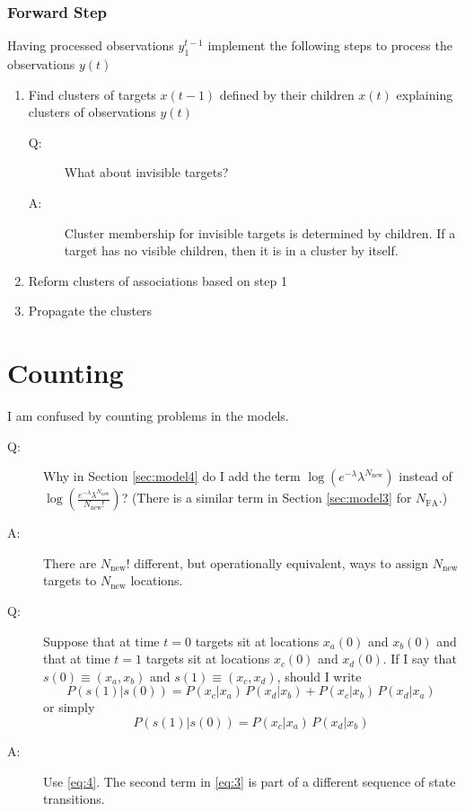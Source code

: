 \documentclass[11pt]{article}
\newcommand{\ti}[2]{{#1}{(#2)}}                         %
\newcommand{\ts}[4]{{#1}_{#3}^{#4}} %
\begin{document}
\subsubsection{Forward Step}
\label{sec:forward_b_m}

Having processed observations $\ts{y}{\tau}{1}{t-1}$ implement the
following steps to process the observations $\ti{y}{t}$
\begin{enumerate}
\item Find clusters of targets $\ti{x}{t-1}$ defined by their children
  $\ti{x}{t}$ explaining clusters of observations $\ti{y}{t}$
  \begin{description}
  \item[Q:] What about invisible targets?
  \item[A:] Cluster membership for invisible targets is determined by
    children.  If a target has no visible children, then it is in a
    cluster by itself.
  \end{description}
\item Reform clusters of associations based on step 1
\item Propagate the clusters
\end{enumerate}

\appendix
\section{Counting}
\label{sec:counting}

I am confused by counting problems in the models.
\begin{description}
\item[Q:] Why in Section \ref{sec:model4} do I add the term $\log
  \left( e^{-\lambda} \lambda^{N_{\text{new}}} \right)$ instead of
  $\log \left(
    \frac{e^{-\lambda}\lambda^{N_{\text{new}}}}{N_{\text{new}}!}\right)$?
  (There is a similar term in Section \ref{sec:model3} for
  $N_{\text{FA}}$.)
\item[A:] There are $N_{\text{new}}!$ different, but operationally
  equivalent, ways to assign $N_{\text{new}}$ targets to
  $N_{\text{new}}$ locations.
\item[Q:] Suppose that at time $t=0$ targets sit at locations
  $\ti{x_a}{0}$ and $\ti{x_b}{0}$ and that at time $t=1$ targets sit
  at locations $\ti{x_c}{0}$ and $\ti{x_d}{0}$.  If I say that
  $\ti{s}{0}\equiv \left(x_a,x_b \right)$ and $\ti{s}{1}\equiv
  \left(x_c,x_d \right)$, should I write
  \begin{equation}
    \label{eq:3}
    P(\ti{s}{1}|\ti{s}{0}) =  P(x_c|x_a) \,  P(x_d|x_b) +  P(x_c|x_b)
    \,  P(x_d|x_a)
  \end{equation}
  or simply
  \begin{equation}
    \label{eq:4}
    P(\ti{s}{1}|\ti{s}{0}) =  P(x_c|x_a) \,  P(x_d|x_b)
  \end{equation}
\item[A:] Use \eqref{eq:4}.  The second term in \eqref{eq:3} is part
  of a different sequence of state transitions.
\end{description}
\end{document}
